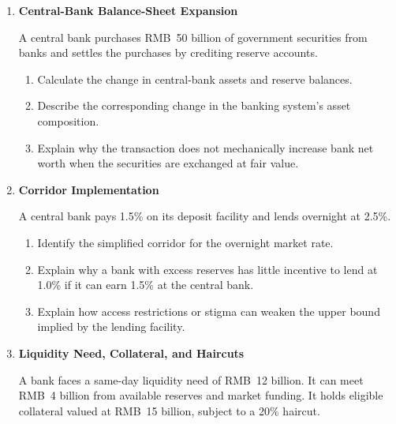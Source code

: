 \begin{enumerate}

\item \textbf{Central-Bank Balance-Sheet Expansion}

A central bank purchases RMB~50 billion of government securities from banks and settles the purchases by crediting reserve accounts.

\begin{enumerate}

\item Calculate the change in central-bank assets and reserve balances.

\item Describe the corresponding change in the banking system's asset composition.

\item Explain why the transaction does not mechanically increase bank net worth when the securities are exchanged at fair value.

\end{enumerate}

\item \textbf{Corridor Implementation}

A central bank pays 1.5\% on its deposit facility and lends overnight at 2.5\%.

\begin{enumerate}

\item Identify the simplified corridor for the overnight market rate.

\item Explain why a bank with excess reserves has little incentive to lend at 1.0\% if it can earn 1.5\% at the central bank.

\item Explain how access restrictions or stigma can weaken the upper bound implied by the lending facility.

\end{enumerate}

\item \textbf{Liquidity Need, Collateral, and Haircuts}

A bank faces a same-day liquidity need of RMB~12 billion. It can meet RMB~4 billion from available reserves and market funding. It holds eligible collateral valued at RMB~15 billion, subject to a 20\% haircut.

\begin{enumerate}


\end{enumerate}
\end{enumerate}
